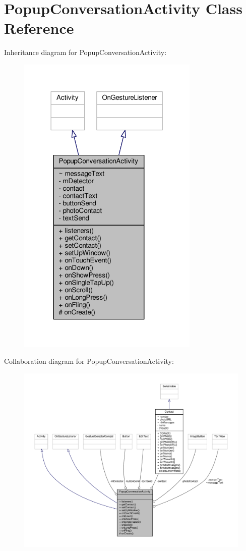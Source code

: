 \hypertarget{a00012}{\section{Popup\+Conversation\+Activity Class Reference}
\label{a00012}
}


Inheritance diagram for Popup\+Conversation\+Activity\+:
\nopagebreak
\begin{figure}[H]
\begin{center}
\leavevmode
\includegraphics[width=246pt]{a00080}
\end{center}
\end{figure}


Collaboration diagram for Popup\+Conversation\+Activity\+:
\nopagebreak
\begin{figure}[H]
\begin{center}
\leavevmode
\includegraphics[width=350pt]{a00081}
\end{center}
\end{figure}

